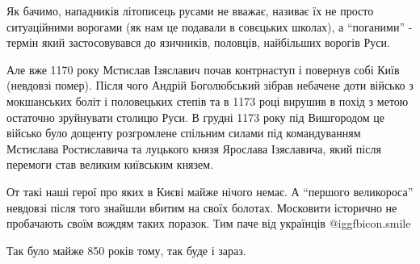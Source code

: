 Як бачимо, нападників літописець русами не вважає, називає їх не просто
ситуаційними ворогами (як нам це подавали в совєцьких школах), а
\enquote{поганими} - термін який застосовувався до язичників, половців,
найбільших ворогів Руси. 

Але вже 1170 року Мстислав Ізяславич почав контрнаступ і повернув собі Київ
(невдовзі помер). Після чого Андрій Боголюбський зібрав небачене доти військо з
мокшанських боліт і половецьких степів та в 1173 році вирушив в похід з метою
остаточно зруйнувати столицю Руси. В грудні 1173 року під Вишгородом це військо
було дощенту розгромлене спільним силами під командуванням Мстислава
Ростиславича та луцького князя Ярослава Ізяславича, який після перемоги став
великим київським князем. 

От такі наші герої про яких в Києві майже нічого немає. А \enquote{першого
великороса} невдовзі після того знайшли вбитим на своїх болотах. Московити
історично не пробачають своїм вождям таких поразок. Тим паче від українців  @igg{fbicon.smile}   

Так було майже 850 років тому, так буде і зараз.
